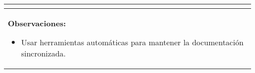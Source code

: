 \begin{table}[H]
\begin{center}
\begin{tabularx}{\textwidth}{|l|X|l|}
{\begin{itemize}
                    \end{itemize}
            }\\
            \hline
            \multicolumn{3}{|p{\textwidth}|}{
                \textbf{Observaciones:}
                \begin{itemize}
                    \item Usar herramientas automáticas para mantener la documentación sincronizada.
                \end{itemize}
            }\\
            \hline
        \end{tabularx}
    \end{center}
\end{table}


